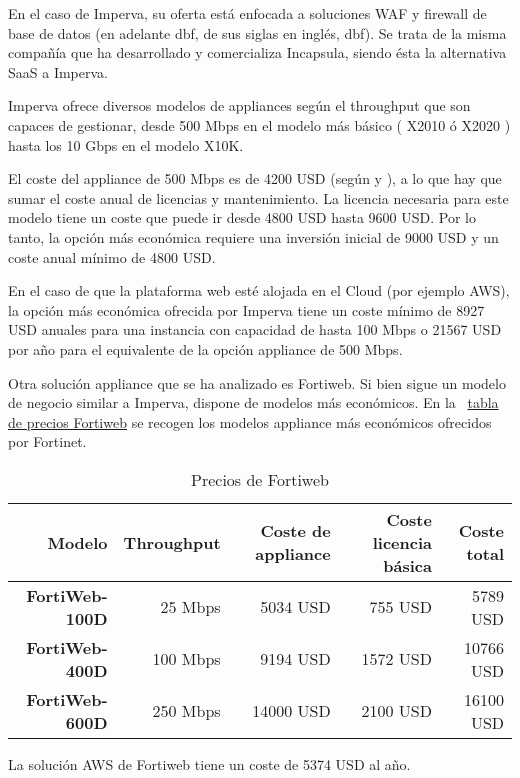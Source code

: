 \par En el caso de Imperva, su oferta está enfocada a soluciones WAF y firewall de base de datos (en adelante \acrshort{dbf}, de sus siglas en
inglés, \acrlong{dbf}). Se trata de la misma compañía que ha desarrollado y comercializa Incapsula, siendo ésta la alternativa SaaS a Imperva.
\par Imperva ofrece diversos modelos de appliances según el throughput que son capaces de gestionar, desde 500 Mbps en el modelo más
básico ( X2010 ó X2020 ) hasta los 10 Gbps en el modelo X10K. \par El coste del appliance de 500 Mbps es de 4200 USD (según \cite{impervacost1} y
\cite{impervacost2}), a lo que hay que sumar el coste anual de licencias y mantenimiento. La licencia necesaria para este modelo tiene un
coste que puede ir desde 4800 USD\cite{impervacost3} hasta 9600 USD\cite{impervacost4}. Por lo tanto, la opción más económica requiere una
inversión inicial de 9000 USD y un coste anual mínimo de 4800 USD.

\par En el caso de que la plataforma web esté alojada en el Cloud (por ejemplo AWS), la opción más económica ofrecida por Imperva tiene un
coste mínimo de 8927 USD anuales para una instancia con capacidad de hasta 100 Mbps\cite{impervaawscost1} o 21567 USD por año para el equivalente de
la opción appliance de 500 Mbps\cite{impervaawscost2}.

\par Otra solución appliance que se ha analizado es Fortiweb. Si bien sigue un modelo de negocio similar a Imperva, dispone de modelos más
económicos. En la {~\hyperref[tab:preciosfortiweb]{tabla de precios Fortiweb}} se recogen los modelos appliance más económicos ofrecidos por
Fortinet.

\begin{table}[h!]
  \centering
  \label{tab:preciosfortiweb}
  \begin{tabular}{|r|r|r|r|r|}
    \hline
    Modelo                  & Throughput & Coste de appliance             & Coste licencia básica          & Coste total  \\
    \hline
    \textbf{FortiWeb-100D}  & 25 Mbps    & 5034 USD\cite{fortiwebcost1}  & 755 USD\cite{fortiwebcost1}   &  5789 USD    \\
    \hline
    \textbf{FortiWeb-400D}  & 100 Mbps   & 9194 USD\cite{fortiwebcost2}  & 1572 USD\cite{fortiwebcost2}  & 10766 USD    \\
    \hline
    \textbf{FortiWeb-600D}  & 250 Mbps   & 14000 USD\cite{fortiwebcost3} & 2100  USD\cite{fortiwebcost3} & 16100 USD    \\
    \hline
  \end{tabular}
  \caption{Precios de Fortiweb}
\end{table}
\par La solución AWS de Fortiweb tiene un coste de 5374 USD\cite{fortiwebcost4} al año.

